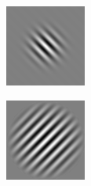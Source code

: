 \begin{figure}[h!]
\begin{subfigure}{0.25\textwidth}
  \centering
  \includegraphics[width=.8\linewidth]{img/gabor1}
\end{subfigure}%
\begin{subfigure}{0.25\textwidth}
  \centering
  \includegraphics[width=.8\linewidth]{img/gabor2}
\end{subfigure}%
\begin{subfigure}{0.25\textwidth}
  \centering

\end{subfigure}
\end{figure}
